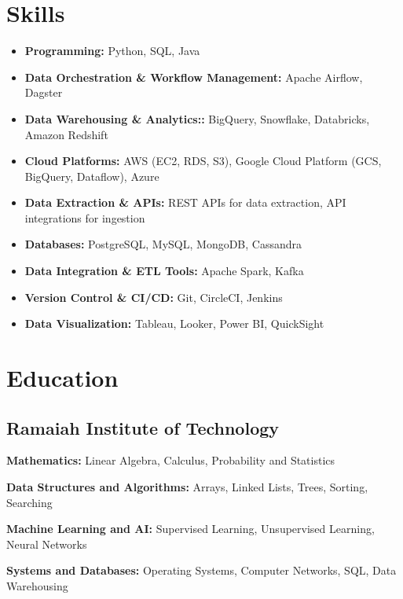 \documentclass[]{deedy-resume-reversed}
\begin{document}
\begin{minipage}[t]{0.33\textwidth}




\section{Skills}
\begin{itemize}
  \item \textbf{Programming:} Python, SQL, Java
  \item \textbf{Data Orchestration \& Workflow Management:} Apache Airflow, Dagster
  \item \textbf{Data Warehousing \& Analytics::} BigQuery, Snowflake, Databricks, Amazon Redshift
  \item \textbf{Cloud Platforms:} AWS (EC2, RDS, S3), Google Cloud Platform (GCS, BigQuery, Dataflow), Azure
  \item \textbf{Data Extraction \& APIs:} REST APIs for data extraction, API integrations for ingestion
  \item \textbf{Databases:} PostgreSQL, MySQL, MongoDB, Cassandra
  \item \textbf{Data Integration \& ETL Tools:} Apache Spark, Kafka
  \item \textbf{Version Control \& CI/CD:} Git, CircleCI, Jenkins
  \item \textbf{Data Visualization:} Tableau, Looker, Power BI, QuickSight
\end{itemize}
\sectionsep


\section{Education}

\subsection{Ramaiah Institute of Technology}
\begin{tightemize}
  \item \textbf{Mathematics:} Linear Algebra, Calculus, Probability and Statistics
  \item \textbf{Data Structures and Algorithms:} Arrays, Linked Lists, Trees, Sorting, Searching
  \item \textbf{Machine Learning and AI:} Supervised Learning, Unsupervised Learning, Neural Networks
  \item \textbf{Systems and Databases:} Operating Systems, Computer Networks, SQL, Data Warehousing
\end{tightemize}
\sectionsep


\end{minipage}
\end{document}
